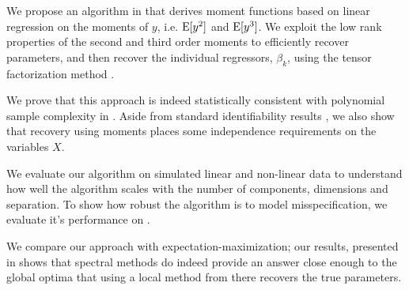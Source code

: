 We propose an algorithm in  that derives moment
functions based on linear regression on the moments of $y$, i.e.
$\operatorname{E}[y^2]$ and $\operatorname{E}[y^3]$. We exploit the low rank properties of the
second and third order moments to efficiently recover parameters, and
then recover the individual regressors, $\beta_k$, using the tensor
factorization method \cite{AnandkumarGeHsu2012}.

We prove that this approach is indeed statistically consistent with
polynomial sample complexity in . Aside from
standard identifiability results \citationneeded, we also show that
recovery using moments places some independence requirements on the
variables $X$. 


We evaluate our algorithm on simulated linear and non-linear data to
understand how well the algorithm scales with the number of components,
dimensions and separation. To show how robust the algorithm is to model
misspecification, we evaluate it's performance on . 


We compare our approach with expectation-maximization; our results,
presented in  shows that spectral methods do
indeed provide an answer close enough to the global optima that using
a local method from there recovers the true parameters.  


